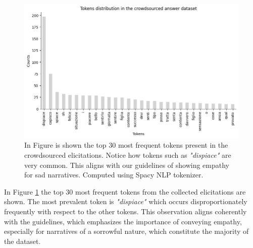 \begin{figure}[!htbp]
    \centering
    \includegraphics[width=1\linewidth]{assets//imgs/dataset-top-30-answers.png}
    \caption{In Figure is shown the top 30 most frequent tokens present in the crowdsourced elicitations. Notice how tokens such as \emph{"dispiace"} are very common. This aligns with our guidelines of showing empathy for sad narratives. Computed using Spacy NLP tokenizer. }
    \label{fig:dataset-top-30-answers}
\end{figure}

In Figure \ref{fig:dataset-top-30-answers} the top 30 most frequent tokens from the collected elicitations are shown. The most prevalent token is \emph{"dispiace"} which occurs disproportionately frequently with respect to the other tokens. This observation aligns coherently with the guidelines, which emphasizes the importance of conveying empathy, especially for narratives of a sorrowful nature, which constitute the majority of the dataset.

